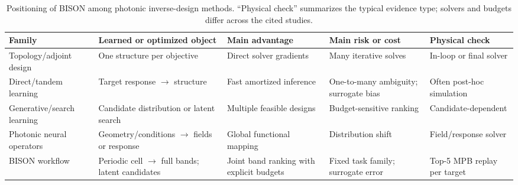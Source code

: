 \begin{table}[t]
  \caption{Positioning of BISON among photonic inverse-design methods.
  ``Physical check'' summarizes the typical evidence type; solvers and budgets
  differ across the cited studies.}
  \label{tab:positioning}
  \centering
  \small
  \begin{tabular}{@{}p{}p{}p{}p{}p{}@{}}
    \toprule
    Family & Learned or optimized object & Main advantage & Main risk or cost & Physical check \\
    \midrule
    Topology/adjoint design & One structure per objective & Direct solver gradients & Many iterative solves & In-loop or final solver \\
    Direct/tandem learning & Target response $\rightarrow$ structure & Fast amortized inference & One-to-many ambiguity; surrogate bias & Often post-hoc simulation \\
    Generative/search learning & Candidate distribution or latent search & Multiple feasible designs & Budget-sensitive ranking & Candidate-dependent \\
    Photonic neural operators & Geometry/conditions $\rightarrow$ fields or response & Global functional mapping & Distribution shift & Field/response solver \\
    BISON workflow & Periodic cell $\rightarrow$ full bands; latent candidates & Joint band ranking with explicit budgets & Fixed task family; surrogate error & Top-5 MPB replay per target \\
    \bottomrule
  \end{tabular}
\end{table}
